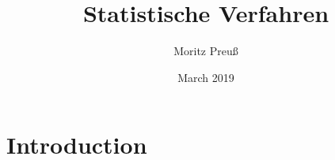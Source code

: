 \documentclass{article}
\title{Statistische Verfahren}
\author{Moritz Preuß}
\date{March 2019}
\begin{document}
\maketitle

\section{Introduction}
\end{document}
